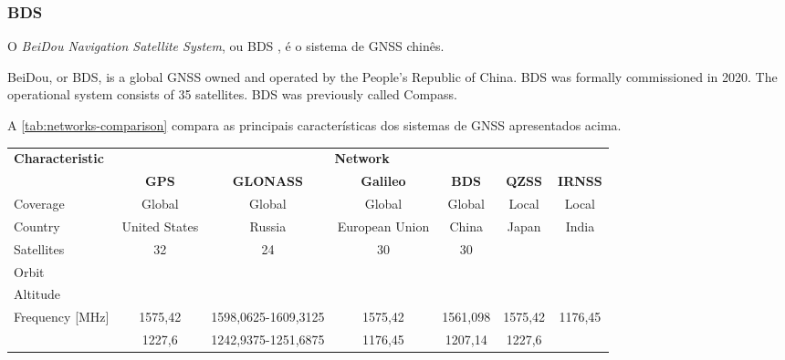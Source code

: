 \subsubsection{BDS}

O \textit{BeiDou Navigation Satellite System}, ou BDS \cite{beidou}, é o sistema de GNSS chinês.

BeiDou, or BDS, is a global GNSS owned and operated by the People's Republic of China. BDS was formally commissioned in 2020. The operational system consists of 35 satellites. BDS was previously called Compass.



A \autoref{tab:networks-comparison} compara as principais características dos sistemas de GNSS apresentados acima.

\begin{table}[!h]
    \centering
    \begin{tabular}{lcccccc}
        \toprule[1.5pt]
        \multirow{2}{*}{\textbf{Characteristic}} & \multicolumn{6}{c}{\textbf{Network}} \\
                                                 & \textbf{GPS} & \textbf{GLONASS} & \textbf{Galileo} & \textbf{BDS} & \textbf{QZSS} & \textbf{IRNSS} \\
        \midrule
        Coverage                         & Global            & Global                       & Global               & Global         & Local   & Local \\
        Country                          & United States     & Russia                       & European Union       & China          & Japan   & India \\
        Satellites                       & 32                & 24                           & 30                   & 30             &         &  \\
        Orbit                            &                   &                              &                      &                &         &  \\
        Altitude                         &                   &                              &                      &                &         &  \\
        \multirow{6}{*}{Frequency [MHz]} & 1575,42           & 1598,0625-1609,3125          & 1575,42              & 1561,098       & 1575,42 & 1176,45 \\
                                         & 1227,6            & 1242,9375-1251,6875          & 1176,45              & 1207,14        & 1227,6  &  \\

\end{tabular}
\end{table}
